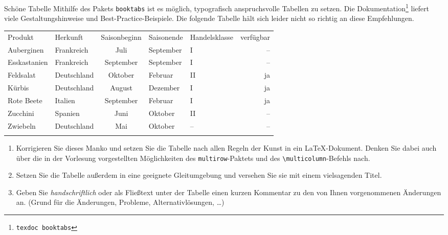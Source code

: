 \documentclass[
	vorläufig=false, 
	blattnr=3,
	ausgabe=2021-11-10,
	abgabe=2021-11-17,
	lösung=true,
	shortverb=false,
]{../tex/latexkurs-exercise}
\begin{document}
\begin{aufgabe}[6]{Schöne Tabelle}
	Mithilfe des Pakets \verb|booktabs| ist es möglich, typografisch anspruchsvolle Tabellen zu setzen. Die Dokumentation\footnote{\texttt{texdoc booktabs}} liefert viele Gestaltungshinweise und Best-Practice-Beispiele. Die folgende Tabelle hält sich leider nicht so richtig an diese Empfehlungen.

	\noindent
	\begin{minipage}{\textwidth}
		\centering
		\begin{tabular}{|p{2.1cm}||p{2.5cm}|cl|lr|}
			\hhline{=-----}
			Produkt & Herkunft & Saisonbeginn & Saisonende & Handelsklasse & verfügbar\\\hhline{======}
			Auberginen & Frankreich & Juli & September & I & – \\\hline
			Esskastanien & Frankreich & September & September & I & – \\\hline
			Feldsalat & Deutschland & Oktober & Februar & II & ja \\\hline
			Kürbis & Deutschland & August & Dezember & I & ja\\\hline
			Rote Beete & Italien & September & Februar & I  & ja\\\hline
			Zucchini & Spanien & Juni & Oktober & II &  –\\\hline
			Zwiebeln & Deutschland & Mai & Oktober & – & –\\\hhline{======}
		\end{tabular}
	\end{minipage}
	
	\begin{enumerate}[label=\alph*)]
		\item Korrigieren Sie dieses Manko und setzen Sie die Tabelle nach allen Regeln der Kunst in ein \LaTeX-Dokument. Denken Sie dabei auch über die in der Vorlesung vorgestellten Möglichkeiten des \verb|multirow|-Paktets und des \texttt{\textbackslash multicolumn}-Befehls nach.
		\item Setzen Sie die Tabelle außerdem in eine geeignete Gleitumgebung und versehen Sie sie mit einem vielsagenden Titel.
		\item Geben Sie \emph{handschriftlich} oder als Fließtext unter der Tabelle einen kurzen Kommentar zu den von Ihnen vorgenommenen Änderungen an. (Grund für die Änderungen, Probleme, Alternativlösungen, …)
	\end{enumerate}
\end{aufgabe}
\end{document}
